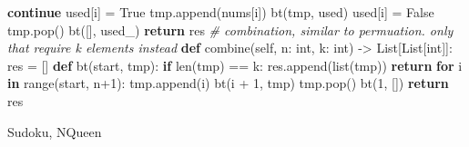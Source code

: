 \documentclass[
]{article}
\newenvironment{Shaded}{}{}
\newcommand{\BuiltInTok}[1]{#1}
\newcommand{\CommentTok}[1]{\textcolor[rgb]{0.38,0.63,0.69}{\textit{#1}}}
\newcommand{\ControlFlowTok}[1]{\textcolor[rgb]{0.00,0.44,0.13}{\textbf{#1}}}
\newcommand{\DecValTok}[1]{\textcolor[rgb]{0.25,0.63,0.44}{#1}}
\newcommand{\KeywordTok}[1]{\textcolor[rgb]{0.00,0.44,0.13}{\textbf{#1}}}
\newcommand{\NormalTok}[1]{#1}
\newcommand{\OperatorTok}[1]{\textcolor[rgb]{0.40,0.40,0.40}{#1}}
\newcommand{\VariableTok}[1]{\textcolor[rgb]{0.10,0.09,0.49}{#1}}
\begin{document}
\begin{Shaded}
\begin{Highlighting}[]
                    \ControlFlowTok{continue}
\NormalTok{                used[i] }\OperatorTok{=} \VariableTok{True}
\NormalTok{                tmp.append(nums[i])}
\NormalTok{                bt(tmp, used)}
\NormalTok{                used[i] }\OperatorTok{=} \VariableTok{False}
\NormalTok{                tmp.pop()}
\NormalTok{        bt([], used\_)}
        \ControlFlowTok{return}\NormalTok{ res}
\CommentTok{\# combination, similar to permuation. only that require k elements instead}
    \KeywordTok{def}\NormalTok{ combine(}\VariableTok{self}\NormalTok{, n: }\BuiltInTok{int}\NormalTok{, k: }\BuiltInTok{int}\NormalTok{) }\OperatorTok{{-}\textgreater{}}\NormalTok{ List[List[}\BuiltInTok{int}\NormalTok{]]:}
\NormalTok{        res }\OperatorTok{=}\NormalTok{ []}
        \KeywordTok{def}\NormalTok{ bt(start, tmp):}
            \ControlFlowTok{if} \BuiltInTok{len}\NormalTok{(tmp) }\OperatorTok{==}\NormalTok{ k:}
\NormalTok{                res.append(}\BuiltInTok{list}\NormalTok{(tmp))}
                \ControlFlowTok{return}
            \ControlFlowTok{for}\NormalTok{ i }\KeywordTok{in} \BuiltInTok{range}\NormalTok{(start, n}\OperatorTok{+}\DecValTok{1}\NormalTok{):}
\NormalTok{                tmp.append(i)}
\NormalTok{                bt(i }\OperatorTok{+} \DecValTok{1}\NormalTok{, tmp)}
\NormalTok{                tmp.pop()}
\NormalTok{        bt(}\DecValTok{1}\NormalTok{, [])}
        \ControlFlowTok{return}\NormalTok{ res}
\end{Highlighting}
\end{Shaded}

Sudoku, NQueen
\end{document}
